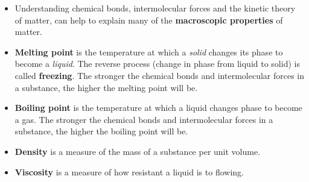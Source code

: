 \begin{itemize}
\item{Understanding chemical bonds, intermolecular forces and the kinetic theory of matter, can help to explain many of the \textbf{macroscopic properties} of matter.}
\item{\textbf{Melting point} is the temperature at which a \textit{solid} changes its phase to become a \textit{liquid}. The reverse process (change in phase from liquid to solid) is called \textbf{freezing}. The stronger the chemical bonds and intermolecular forces in a substance, the higher the melting point will be.}
\item{\textbf{Boiling point} is the temperature at which a liquid changes phase to become a gas. The stronger the chemical bonds and intermolecular forces in a substance, the higher the boiling point will be.}
\item{\textbf{Density} is a measure of the mass of a substance per unit volume.}
\item{\textbf{Viscosity} is a measure of how resistant a liquid is to flowing.}
\end{itemize}

